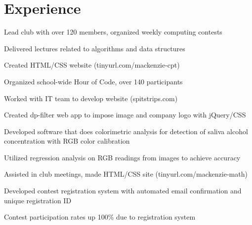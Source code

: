 \documentclass[]{deedy-resume-openfont}
\begin{document}
\begin{minipage}[t]{0.66\textwidth} 


\section{Experience}

\vspace{\topsep} %
\begin{tightemize}
\item Lead club with over 120 members, organized weekly computing contests
\item Delivered lectures related to algorithms and data structures
\item Created HTML/CSS website (tinyurl.com/mackenzie-cpt)
\item Organized school-wide Hour of Code, over 140 participants
\end{tightemize}
\sectionsep

\begin{tightemize}
\item Worked with IT team to develop website (spitstrips.com)
\item Created dp-filter web app to impose image and company logo with jQuery/CSS
\item Developed software that does colorimetric analysis for detection of saliva alcohol concentration with RGB color calibration
\item Utilized regression analysis on RGB readings from images to achieve accuracy
\end{tightemize}
\sectionsep

\begin{tightemize}
\item Assisted in club meetings, made HTML/CSS site (tinyurl.com/mackenzie-math)
\item Developed contest registration system with automated email confirmation and unique registration ID 
\item Contest participation rates up 100\% due to registration system
\end{tightemize}
\sectionsep


\end{minipage}
\end{document}
